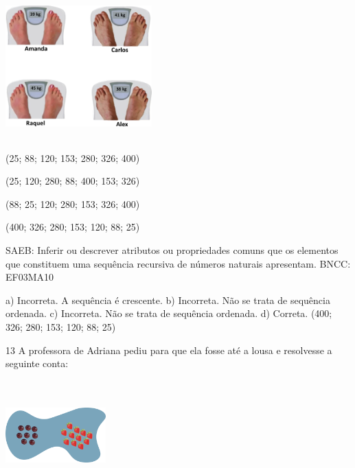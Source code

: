 \begin{multicols}{2}
\begin{enumerate}
{%

\includegraphics[width=2.21686in,height=2.20852in]{media/image113.png}

\begin{escolha}
\item
  (25; 88; 120; 153; 280; 326; 400)
\item
  (25; 120; 280; 88; 400; 153; 326)
\item
  (88; 25; 120; 280; 153; 326; 400)
\item
  (400; 326; 280; 153; 120; 88; 25)
\end{escolha}

SAEB: Inferir ou descrever atributos ou propriedades comuns
que os elementos que constituem uma sequência recursiva de números
naturais apresentam.
BNCC: EF03MA10

a) Incorreta. A sequência é crescente.
b) Incorreta. Não se trata de sequência ordenada.
c) Incorreta. Não se trata de sequência ordenada.
d) Correta. (400; 326; 280; 153; 120; 88; 25)

\num{13} A professora de Adriana pediu para que ela fosse até a lousa e resolvesse a seguinte conta:


\includegraphics[width=1.51680in,height=1.67515in]{media/image114.png}

}
\end{enumerate}
\end{multicols}

